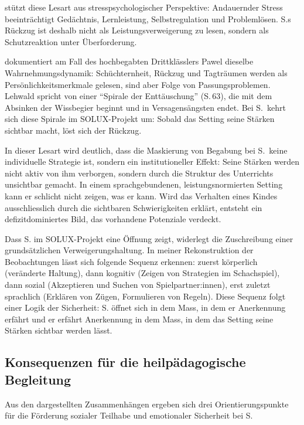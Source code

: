 \documentclass[ngerman, a4paper]{article}
\begin{document}
\textcite[S.\,22--23]{evers2025stress} stützt diese Lesart aus
stresspsychologischer Perspektive: Andauernder Stress beeinträchtigt
Gedächtnis, Lernleistung, Selbstregulation und Problemlösen. S.s Rückzug
ist deshalb nicht als Leistungsverweigerung zu lesen, sondern als
Schutzreaktion unter Überforderung.

\textcite[S.\,57--63]{lehwald2017motivation} dokumentiert am Fall
des hochbegabten Drittklässlers Pawel dieselbe Wahrnehmungsdynamik:
Schüchternheit, Rückzug und Tagträumen werden als
Persönlichkeitsmerkmale gelesen, sind aber Folge von
Passungsproblemen. Lehwald spricht von einer \enquote{Spirale der
  Enttäuschung} (S.\,63), die mit dem Absinken der Wissbegier beginnt
und in Versagensängsten endet. Bei S.\ kehrt sich diese Spirale im
SOLUX-Projekt um: Sobald das Setting seine Stärken sichtbar macht,
löst sich der Rückzug.

In dieser Lesart wird deutlich, dass die Maskierung von Begabung bei S.\
keine individuelle Strategie ist, sondern ein institutioneller Effekt:
Seine Stärken werden nicht aktiv von ihm verborgen, sondern durch die
Struktur des Unterrichts unsichtbar gemacht. In einem sprachgebundenen,
leistungsnormierten Setting kann er schlicht nicht zeigen, was er kann.
Wird das Verhalten eines Kindes ausschliesslich durch die
sichtbaren Schwierigkeiten erklärt, entsteht ein
defizitdominiertes Bild, das vorhandene Potenziale verdeckt.

Dass S. im SOLUX-Projekt eine Öffnung zeigt, widerlegt die Zuschreibung einer
grundsätzlichen Verweigerungshaltung. In meiner Rekonstruktion der Beobachtungen lässt
sich folgende Sequenz erkennen: zuerst körperlich (veränderte Haltung), dann kognitiv
(Zeigen von Strategien im Schachspiel), dann sozial (Akzeptieren und Suchen von
Spielpartner:innen), erst zuletzt sprachlich (Erklären von Zügen, Formulieren von
Regeln). Diese Sequenz folgt einer Logik der Sicherheit: S. öffnet sich
in dem Mass, in dem er Anerkennung erfährt und er erfährt Anerkennung in dem Mass,
in dem das Setting seine Stärken sichtbar werden lässt.

\subsection{Konsequenzen für die heilpädagogische Begleitung}

Aus den dargestellten Zusammenhängen ergeben sich drei Orientierungspunkte für die
Förderung sozialer Teilhabe und emotionaler Sicherheit bei S.
\end{document}

